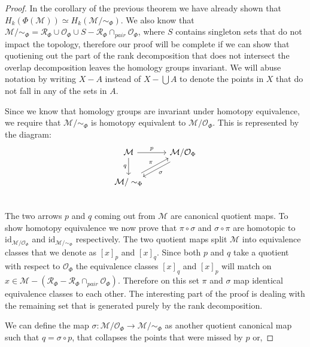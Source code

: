 \documentclass[10pt,a4paper]{amsart}
\begin{document}
\begin{proof}
    
    In the corollary of the previous theorem we have already shown that $H_k(\Phi(\mathcal{M})) \simeq H_k(\mathcal{M}/\sim_\Phi)$. We also know that $\mathcal{M}/\sim_{\Phi}= \mathcal{R}_\Phi \cup \mathcal{O}_\Phi\cup S - \mathcal{R}_\Phi\cap_{pair}\mathcal{O}_\Phi$, {where $S$ contains singleton sets that do not impact the topology}, therefore our proof will be complete if we can show that quotiening out the part of the rank decomposition that does not intersect the overlap decomposition leaves the homology groups invariant. We will abuse notation by writing $X-A$ instead of $X-\bigcup A$ to denote the points in $X$ that do not fall in any of the sets in $A$.

    Since we know that homology groups are invariant under homotopy equivalence, we require that $\mathcal{M}/\sim_\Phi$ is homotopy equivalent to $\mathcal{M}/\mathcal{O}_\Phi$. This is represented by the diagram:
    \begin{equation*}
        \begin{tikzcd}
        \mathcal{M} \arrow[r, "p"] \arrow[d, "q"']
        & \mathcal{M}/\mathcal{O}_\Phi \arrow[ld,shift left = 1, "\sigma"] \\
        \mathcal{M}/\sim_\Phi \arrow[ru, shift left = 1, "\pi"] \\
    \end{tikzcd}
    \end{equation*}
    The two arrows $p$ and $q$ coming out from $\mathcal{M}$ are canonical quotient maps. To show homotopy equivalence we now prove that $\pi \circ \sigma$ and $\sigma \circ \pi$ are homotopic to $\text{id}_{\mathcal{M}/\mathcal{O}_\Phi}$ and $\text{id}_{\mathcal{M}/\sim_\Phi}$ respectively. The two quotient maps split $\mathcal{M}$ into equivalence classes that we denote as $[x]_p$ and $[x]_q$. Since both $p$ and $q$ take a quotient with respect to $\mathcal{O}_\Phi$ the equivalence classes $[x]_q$ and $[x]_p$ will match on $x \in \mathcal{M} - (\mathcal{R}_\Phi-\mathcal{R}_\Phi\cap_{pair}\mathcal{O}_\Phi)$. Therefore on this set $\pi$ and $\sigma$ map identical equivalence classes to each other. The interesting part of the proof is dealing with the remaining set that is generated purely by the rank decomposition.

    We can define the map $\sigma: \mathcal{M}/\mathcal{O}_\Phi \to \mathcal{M}/\sim_\Phi$ as another quotient canonical map such that $q = \sigma \circ p$, that collapses the points that were missed by $p$ or,
    

\end{proof}
\end{document}
